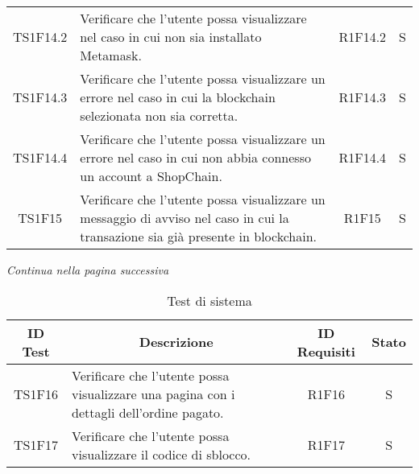 \begin{table}[H]
\begin{tabular}{c|p{8cm}|c|c}
    TS1F14.2  & Verificare che l'utente possa visualizzare nel caso in cui non sia installato Metamask\glo{}.                                          & R1F14.2  & S  \\
    TS1F14.3  & Verificare che l'utente possa visualizzare un errore nel caso in cui la blockchain\glo{} selezionata non sia corretta.                 & R1F14.3  & S  \\
    TS1F14.4  & Verificare che l'utente possa visualizzare un errore nel caso in cui non abbia connesso un account a ShopChain.                        & R1F14.4  & S  \\
    TS1F15    & Verificare che l'utente possa visualizzare un messaggio di avviso nel caso in cui la transazione sia già presente in blockchain\glo{}. & R1F15    & S  \\
  \end{tabular}
\end{table}
\begin{center}
  \textit{\small Continua nella pagina successiva}
\end{center}
\begin{table}[H]
  \centering
  \renewcommand{\arraystretch}{1.8}
  \begin{tabular}{c|p{8cm}|c|c}
    \rowcolor[HTML]{125E28}
    \color[HTML]{FFFFFF}\textbf{ID Test}
           & \multicolumn{1}{c}{\color[HTML]{FFFFFF}\textbf{Descrizione}}
           & \color[HTML]{FFFFFF}\textbf{ID Requisiti}
           & \color[HTML]{FFFFFF}\textbf{Stato}                                                                   \\
    \hline
    TS1F16 & Verificare che l'utente possa visualizzare una pagina con i dettagli dell'ordine pagato. & R1F16 & S \\
    TS1F17 & Verificare che l'utente possa visualizzare il codice di sblocco.                         & R1F17 & S \\
  \end{tabular}
  \caption{Test di sistema}
\end{table}

